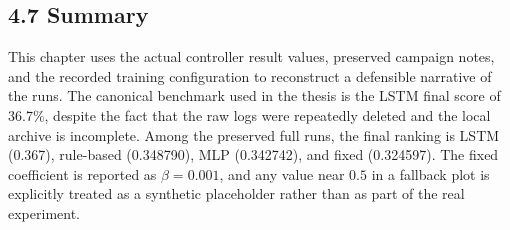 \documentclass{article}
\begin{document}
\subsection*{4.7 Summary}
This chapter uses the actual controller result values, preserved campaign notes, and the recorded training configuration to reconstruct a defensible narrative of the runs. The canonical benchmark used in the thesis is the LSTM final score of 36.7\%, despite the fact that the raw logs were repeatedly deleted and the local archive is incomplete. Among the preserved full runs, the final ranking is LSTM (0.367), rule-based (0.348790), MLP (0.342742), and fixed (0.324597). The fixed coefficient is reported as $\beta = 0.001$, and any value near $0.5$ in a fallback plot is explicitly treated as a synthetic placeholder rather than as part of the real experiment.
\end{document}
